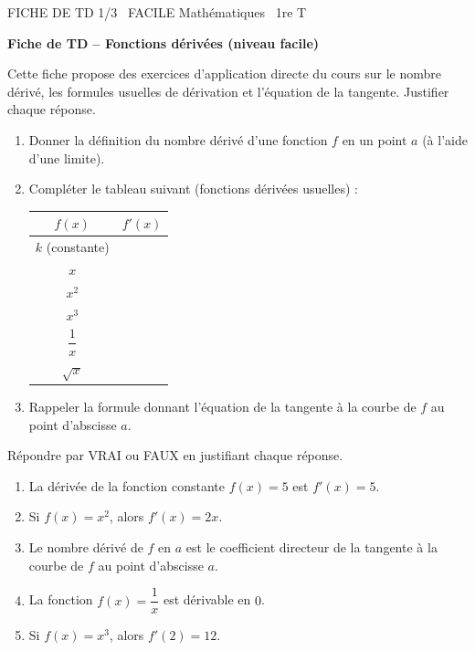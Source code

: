 \documentclass[11pt]{article}
\begin{document}
\begin{tcolorbox}[enhanced,colback=popink,colframe=popink,arc=10pt,boxrule=0pt,left=12pt,right=12pt,top=9pt,bottom=9pt]
{\color{white}\popxbold\small FICHE DE TD 1/3 \textbullet\ FACILE \hfill Mathématiques \textbullet\ 1re T\par}
\end{tcolorbox}
\vspace{4pt}
\textbf{Fiche de TD -- Fonctions dérivées (niveau facile)}

Cette fiche propose des exercices d'application directe du cours sur le nombre dérivé, les formules usuelles de dérivation et l'équation de la tangente. Justifier chaque réponse.

\begin{exercice}
\begin{enumerate}
\item Donner la définition du nombre dérivé d'une fonction $f$ en un point $a$ (à l'aide d'une limite).
\item Compléter le tableau suivant (fonctions dérivées usuelles) :

\begin{tabular}{|c|c|}
\hline
$f(x)$ & $f'(x)$ \\
\hline
$k$ (constante) & \\
\hline
$x$ & \\
\hline
$x^2$ & \\
\hline
$x^3$ & \\
\hline
$\dfrac{1}{x}$ & \\
\hline
$\sqrt{x}$ & \\
\hline
\end{tabular}
\item Rappeler la formule donnant l'équation de la tangente à la courbe de $f$ au point d'abscisse $a$.
\end{enumerate}
\end{exercice}

\begin{exercice}
Répondre par VRAI ou FAUX en justifiant chaque réponse.
\begin{enumerate}
\item La dérivée de la fonction constante $f(x)=5$ est $f'(x)=5$.
\item Si $f(x)=x^2$, alors $f'(x)=2x$.
\item Le nombre dérivé de $f$ en $a$ est le coefficient directeur de la tangente à la courbe de $f$ au point d'abscisse $a$.
\item La fonction $f(x)=\dfrac{1}{x}$ est dérivable en $0$.
\item Si $f(x)=x^3$, alors $f'(2)=12$.
\end{enumerate}
\end{exercice}
\end{document}
